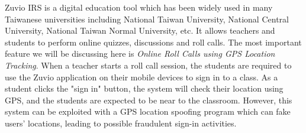 Zuvio IRS is a digital education tool which has been widely used in many Taiwanese universities
including National Taiwan University, National Central University, National Taiwan Normal University, etc.
It allows teachers and students to perform online quizzes, discussions and roll calls. The most
important feature we will be discussing here is \emph{Online Roll Calls using GPS Location Tracking}.
When a teacher starts a roll call session, the students are required to use the Zuvio application
on their mobile devices to sign in to a class. As a student clicks the "sign in" button, the system will
check their location using GPS, and the students are expected to be near to the classroom. However, this
system can be exploited with a GPS location spoofing program which can fake users' locations,
leading to possible fraudulent sign-in activities.
